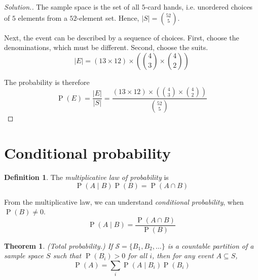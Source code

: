 \documentclass[11pt,letterpaper]{article}
\makeatletter
\newtheorem{thm}{Theorem}
\theoremstyle{definition}
\newtheorem{defn}{Definition}[section]
\theoremstyle{remark}
\newenvironment{solution}{
    \let\oldqedsymbol=\qedsymbol%
    \def\@addpunct##1{}%
    \renewcommand{\qedsymbol}{$\blacktriangleleft$}%
    \begin{proof}[\textit Solution.]
}{
    \end{proof}%
    \renewcommand{\qedsymbol}{\oldqedsymbol}
}
\newcommand{\parens}[1]{\left(#1\right)}
\newcommand{\intersn}{\cap}
\newcommand{\given}{\;\vert\;}
\DeclareMathOperator{\Prob}{P}
\renewcommand{\P}[1]{\Prob{\parens{#1}}}
\makeatother
\begin{document}
\begin{solution}
    The sample space is the set of all $5$-card hands, i.e. unordered choices
    of $5$ elements from a $52$-element set. Hence, $|S| = {52 \choose 5}$.

    Next, the event can be described by a sequence of choices. First, choose
    the denominations, which must be different. Second, choose the suits.
    \begin{equation*}
        |E| = (13 \times 12) \times \parens{{4 \choose 3} \times {4 \choose 2}}
    \end{equation*}

    The probability is therefore
    \begin{equation*}
        \P{E}
        = \frac{|E|}{|S|}
        = \frac{
            (13 \times 12) \times \parens{{4 \choose 3} \times {4 \choose 2}}
        }{
            {52 \choose 5}
        }
    \end{equation*}
\end{solution}

\section{Conditional probability}

\begin{defn}
    The \emph{multiplicative law of probability} is
    \begin{equation}
        \label{eq:multiplicative-law}
        \P{A \given B} \P{B} = \P{A \intersn B}
    \end{equation}

    From the multiplicative law, we can understand
    \emph{conditional probability}, when $\P{B} \neq 0$.
    \begin{equation}
        \label{eq:conditional-probability}
        \P{A \given B} = \frac{\P{A \intersn B}}{\P{B}}
    \end{equation}
\end{defn}

\begin{thm}{(Total probability.)}
    \label{thm:total-probability}
    If $\mathcal{S} = \{B_1, B_2, \ldots\}$ is a countable partition of a
    sample space $S$ such that $\P{B_i} > 0$ for all $i$, then for any event
    $A \subseteq S$,
    \begin{equation*}
        \P{A} = \sum_{i} \P{A \given B_i} \P{B_i}
    \end{equation*}
\end{thm}
\end{document}
